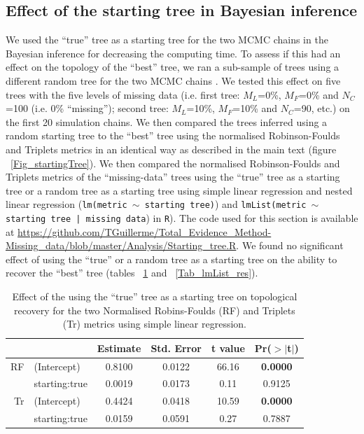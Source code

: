 \documentclass[12pt,letterpaper]{article}
\begin{document}
\subsection{Effect of the starting tree in Bayesian inference}
We used the ``true'' tree as a starting tree for the two MCMC chains in the Bayesian inference for decreasing the computing time.
To assess if this had an effect on the topology of the ``best'' tree, we ran a sub-sample of trees using a different random tree for the two MCMC chains \citep[default MrBayes option;][]{Ronquist2012mrbayes}.
We tested this effect on five trees with the five levels of missing data (i.e. first tree: $M_L$=0\%, $M_F$=0\% and $N_C$=100 (i.e. 0\% ``missing''); second tree: $M_L$=10\%, $M_F$=10\% and $N_C$=90, etc.) on the first 20 simulation chains.
We then compared the trees inferred using a random starting tree to the ``best'' tree using the normalised Robinson-Foulds and Triplets metrics in an identical way as described in the main text (figure ~\ref{Fig_startingTree}).
We then compared the normalised Robinson-Foulds and Triplets metrics of the ``missing-data'' trees using the ``true'' tree as a starting tree or a random tree as a starting tree using simple linear regression and nested linear regression (\texttt{lm(metric $\sim$ starting tree)}) and \texttt{lmList(metric $\sim$ starting tree | missing data}) in \texttt{R}).
The code used for this section is available at \url{https://github.com/TGuillerme/Total_Evidence_Method-Missing_data/blob/master/Analysis/Starting_tree.R}.
We found no significant effect of using the ``true'' or a random tree as a starting tree on the ability to recover the ``best'' tree (tables ~\ref{Tab_lm_res} and ~\ref{Tab_lmList_res}).

\begin{table}[ht]
\caption{Effect of the using the ``true'' tree as a starting tree on topological recovery for the two Normalised Robins-Foulds (RF) and Triplets (Tr) metrics using simple linear regression.}
\label{Tab_lm_res}
\centering
\begin{tabular}{rlcccc}
  \hline
 & & Estimate & Std. Error & t value & Pr($>$$|$t$|$) \\ 
  \hline
RF & (Intercept) & 0.8100 & 0.0122 & 66.16 & \textbf{0.0000} \\ 
   & starting:true & 0.0019 & 0.0173 & 0.11 & 0.9125 \\
Tr & (Intercept) & 0.4424 & 0.0418 & 10.59 & \textbf{0.0000} \\ 
   & starting:true & 0.0159 & 0.0591 & 0.27 & 0.7887 \\ 
   \hline
\end{tabular}
\end{table}
\end{document}
